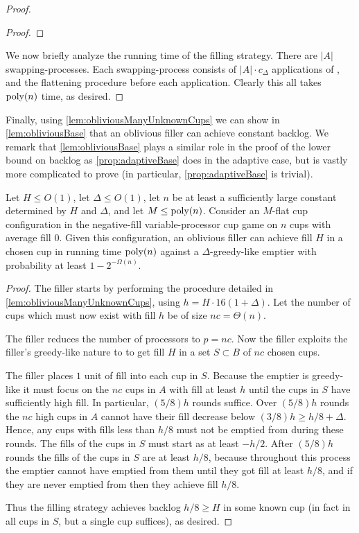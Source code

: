 \begin{proof}
\begin{proof}
\end{proof}

We now briefly analyze the running time of the filling strategy.
There are $|A|$ swapping-processes. Each swapping-process
consists of $|A|\cdot c_\Delta$ applications of \randalg, and
the flattening procedure before each application. 
Clearly this all takes $\operatorname{\text{poly}}(n)$ time, as desired.
  
\end{proof}

Finally, using \cref{lem:obliviousManyUnknownCups} we can show in
\cref{lem:obliviousBase} that an oblivious filler can achieve
constant backlog. We remark that \cref{lem:obliviousBase} plays a
similar role in the proof of the lower bound on backlog as
\cref{prop:adaptiveBase} does in the adaptive case, but is vastly
more complicated to prove (in particular,
\cref{prop:adaptiveBase} is trivial).
\begin{lemma}
  \label{lem:obliviousBase}
  Let $H \le O(1)$, let $\Delta \le O(1)$, let $n$ be at
  least a sufficiently large constant determined by $H$ and
  $\Delta$, and let $M \le \operatorname{\text{poly}}(n)$. 
  Consider an $M$-flat cup configuration in the negative-fill variable-processor cup
  game on $n$ cups with average fill $0$.
  Given this configuration, an oblivious filler can achieve fill $H$
  in a chosen cup in running time $\operatorname{\text{poly}}(n)$ against a
  $\Delta$-greedy-like emptier with probability at least $1-2^{-\Omega(n)}.$
\end{lemma}
\begin{proof}
  The filler starts by performing the procedure detailed in
  \ref{lem:obliviousManyUnknownCups}, using $h = H\cdot
  16(1+\Delta)$. Let the number of cups which must now exist with
  fill $h$ be of size $nc = \Theta(n)$.

  The filler reduces the number of processors to $p=nc$. 
  Now the filler exploits the filler's greedy-like nature to
  to get fill $H$ in a set $S\subset B$ of $nc$ chosen cups.

  The filler places $1$ unit of fill into each cup in $S$.
  Because the emptier is greedy-like it must focus on the $nc$
  cups in $A$ with fill at least $h$ until the cups in $S$ have
  sufficiently high fill. In particular, $(5/8)h$ rounds suffice.
  Over $(5/8)h$ rounds the $nc$ high cups in $A$ cannot have
  their fill decrease below $(3/8)h \ge h/8 + \Delta$. Hence, any
  cups with fills less than $h/8$ must not be emptied from during
  these rounds. The fills of the cups in $S$ must start
  as at least $-h/2$. After $(5/8)h$ rounds the fills of the cups
  in $S$ are at least $h/8$, because throughout this process the
  emptier cannot have emptied from them until they got fill at
  least $h/8$, and if they are never emptied from then they
  achieve fill $h/8$.

  Thus the filling strategy achieves backlog $h/8 \ge H$ in some
  known cup (in fact in all cups in $S$, but a single cup
  suffices), as desired.

\end{proof}

